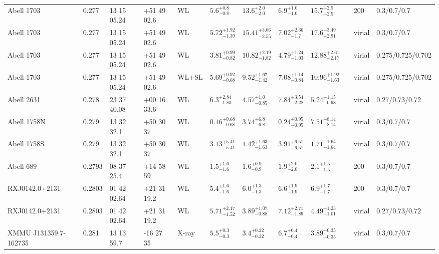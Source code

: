 \begin{landscape}
\begin{center}
{\begin{longtable}{llllllllllll}
Abell 1703 & 0.277 & 13 15 05.24 & +51 49 02.6 & WL & ${5.6}^{+0.8}_{-0.8}$ & ${13.6}^{+2.0}_{-2.0}$ & ${6.9}^{+1.0}_{-1.0}$ & ${15.7}^{+2.5}_{-2.5}$ & \citet{SE14.1} & 200 & 0.3/0.7/0.7 \\
Abell 1703 & 0.277 & 13 15 05.24 & +51 49 02.6 & WL & ${5.72}^{+1.92}_{-1.39}$ & ${15.41}^{+3.06}_{-2.55}$ & ${7.02}^{+2.36}_{-1.7}$ & ${17.6}^{+3.49}_{-2.91}$ & \citet{UM11.1} & virial & 0.3/0.7/0.7 \\
Abell 1703 & 0.277 & 13 15 05.24 & +51 49 02.6 & WL & ${3.81}^{+0.99}_{-0.82}$ & ${10.82}^{+2.19}_{-1.82}$ & ${4.79}^{+1.24}_{-1.03}$ & ${12.88}^{+2.61}_{-2.17}$ & \citet{OG12.1} & virial & 0.275/0.725/0.702 \\
Abell 1703 & 0.277 & 13 15 05.24 & +51 49 02.6 & WL+SL & ${5.69}^{+0.92}_{-0.68}$ & ${9.52}^{+1.67}_{-1.42}$ & ${7.08}^{+1.14}_{-0.84}$ & ${10.96}^{+1.92}_{-1.63}$ & \citet{OG12.1} & virial & 0.275/0.725/0.702 \\
Abell 2631 & 0.278 & 23 37 40.08 & +00 16 33.6 & WL & ${6.3}^{+2.84}_{-1.83}$ & ${4.57}^{+1.0}_{-0.85}$ & ${7.84}^{+3.54}_{-2.28}$ & ${5.24}^{+1.15}_{-0.98}$ & \citet{OK10.1} & virial & 0.27/0.73/0.72 \\
Abell 1758N & 0.279 & 13 32 32.1 & +50 30 37 & WL & ${0.16}^{+0.68}_{-0.68}$ & ${3.74}^{+6.8}_{-6.8}$ & ${0.24}^{+0.95}_{-0.95}$ & ${7.51}^{+8.14}_{-8.14}$ & \citet{OK08.1} & virial & 0.3/0.7/0.7 \\
Abell 1758S & 0.279 & 13 32 32.1 & +50 30 37 & WL & ${3.13}^{+5.41}_{-5.41}$ & ${1.42}^{+1.63}_{-1.63}$ & ${3.91}^{+6.51}_{-6.51}$ & ${1.71}^{+1.64}_{-1.64}$ & \citet{OK08.1} & virial & 0.3/0.7/0.7 \\
Abell 689 & 0.2793 & 08 37 25.4 & +14 58 59 & WL & ${1.5}^{+1.6}_{-1.6}$ & ${1.6}^{+0.9}_{-0.9}$ & ${1.9}^{+2.0}_{-2.0}$ & ${2.1}^{+1.5}_{-1.5}$ & \citet{SE14.1} & 200 & 0.3/0.7/0.7 \\
RXJ0142.0+2131 & 0.2803 & 01 42 02.64 & +21 31 19.2 & WL & ${5.4}^{+1.6}_{-1.6}$ & ${6.0}^{+1.3}_{-1.3}$ & ${6.6}^{+1.9}_{-1.9}$ & ${6.9}^{+1.7}_{-1.7}$ & \citet{SE14.1} & 200 & 0.3/0.7/0.7 \\
RXJ0142.0+2131 & 0.2803 & 01 42 02.64 & +21 31 19.2 & WL & ${5.71}^{+2.17}_{-1.52}$ & ${3.89}^{+1.07}_{-0.88}$ & ${7.12}^{+2.71}_{-1.89}$ & ${4.49}^{+1.23}_{-1.01}$ & \citet{OK10.1} & virial & 0.27/0.73/0.72 \\
XMMU J131359.7-162735 & 0.281 & 13 13 59.7 & -16 27 35 & X-ray & ${5.5}^{+0.3}_{-0.3}$ & ${3.4}^{+0.32}_{-0.32}$ & ${6.7}^{+0.4}_{-0.4}$ & ${3.89}^{+0.35}_{-0.35}$ & \citet{GA07.1} & virial & 0.3/0.7/0.7 \\

\end{longtable}}
\end{center}
\end{landscape}
